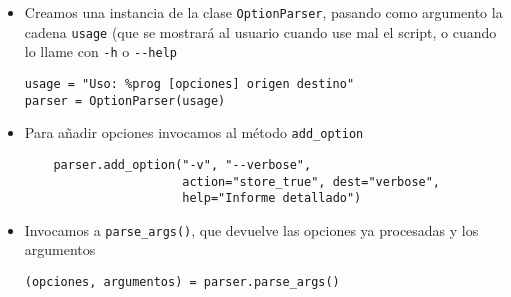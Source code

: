 \documentclass[ucs]{beamer}
\begin{document}
\begin{frame}[fragile]
\frametitle{}
\begin{itemize}
\item
Creamos una instancia de la clase \verb|OptionParser|, pasando
como argumento la cadena \verb|usage| (que se mostrará
al usuario cuando use mal el script, o cuando lo llame
con \verb|-h| o \verb|--help|

  \begin{footnotesize}
  \begin{verbatim}
usage = "Uso: %prog [opciones] origen destino"
parser = OptionParser(usage)

  \end{verbatim}
  \end{footnotesize}

\item
Para añadir opciones invocamos al método \verb|add_option|

  \begin{footnotesize}
  \begin{verbatim}
    parser.add_option("-v", "--verbose",
                      action="store_true", dest="verbose",
                      help="Informe detallado")
  \end{verbatim}
  \end{footnotesize}
\item
Invocamos a \verb|parse_args()|, que devuelve las opciones ya procesadas
y los argumentos

  \begin{footnotesize}
  \begin{verbatim}
(opciones, argumentos) = parser.parse_args()
  \end{verbatim}
  \end{footnotesize}


\end{itemize}

\end{frame}
\end{document}
